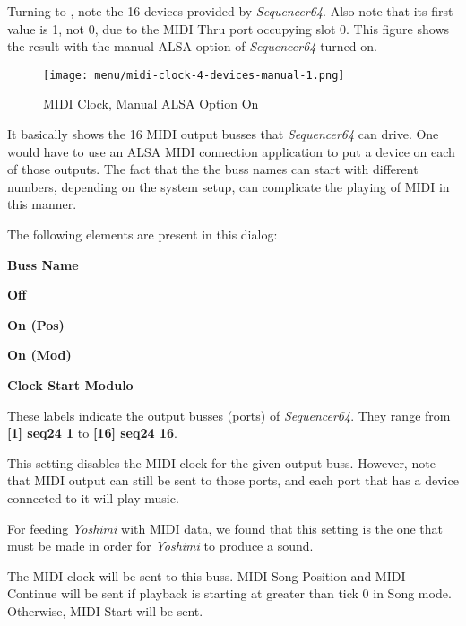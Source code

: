    Turning to ,
   note the 16 devices provided by
   \textsl{Sequencer64}.  Also note that its first value is 1, not 0, due to
   the MIDI Thru port occupying slot 0.
   This figure shows the result with the manual ALSA option of
   \textsl{Sequencer64} turned on.

\begin{figure}[H]
   \centering 
   \texttt{[image: menu/midi-clock-4-devices-manual-1.png]}
   \caption{MIDI Clock, Manual ALSA Option On}
   \label{fig:seq64_midi_clock_4_devices_manual_1}
\end{figure}

   It basically shows the 16 MIDI output busses that \textsl{Sequencer64} can
   drive.  One would have to use an ALSA MIDI connection application to put a
   device on each of those outputs.  The fact that the the buss names can
   start with different numbers, depending on the system setup, can complicate
   the playing of MIDI in this manner.

   The following elements are present in this dialog:

   \begin{enumber}
      \item \textbf{Buss Name}
      \item \textbf{Off}
      \item \textbf{On (Pos)}
      \item \textbf{On (Mod)}
      \item \textbf{Clock Start Modulo}
   \end{enumber}

   \setcounter{ItemCounter}{0}      %

   These labels indicate the output busses (ports) of \textsl{Sequencer64}.
   They range from \textbf{[1] seq24 1} to \textbf{[16] seq24 16}.

   This setting disables the MIDI clock for the given output buss.
   However, note that MIDI output can still be sent to those ports, and
   each port that has a device connected to it will play music.
   
   For feeding \textsl{Yoshimi} with MIDI data, we found that this
   setting is the one that must be made in order for \textsl{Yoshimi} to
   produce a sound.

   The MIDI clock will be sent to this buss.
   MIDI Song Position and MIDI Continue will be sent if playback is starting
   at greater than tick 0 in Song mode.  Otherwise, MIDI Start will be sent.

